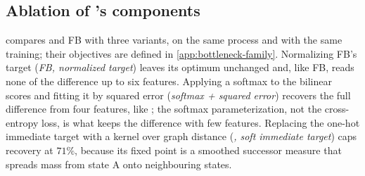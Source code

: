 \subsection{Ablation of \name{}'s components}
\label{app:bottleneck-ablation}
 compares \name{} and FB with three variants, on the same process and with the same training; their objectives are defined in \cref{app:bottleneck-family}.
Normalizing FB's target (\emph{FB, normalized target}) leaves its optimum unchanged and, like FB, reads none of the difference up to six features.
Applying a softmax to the bilinear scores and fitting it by squared error (\emph{softmax + squared error}) recovers the full difference from four features, like \name{}; the softmax parameterization, not the cross-entropy loss, is what keeps the difference with few features.
Replacing the one-hot immediate target with a kernel over graph distance (\emph{\name{}, soft immediate target}) caps recovery at $71\%$, because its fixed point is a smoothed successor measure that spreads mass from state A onto neighbouring states.

